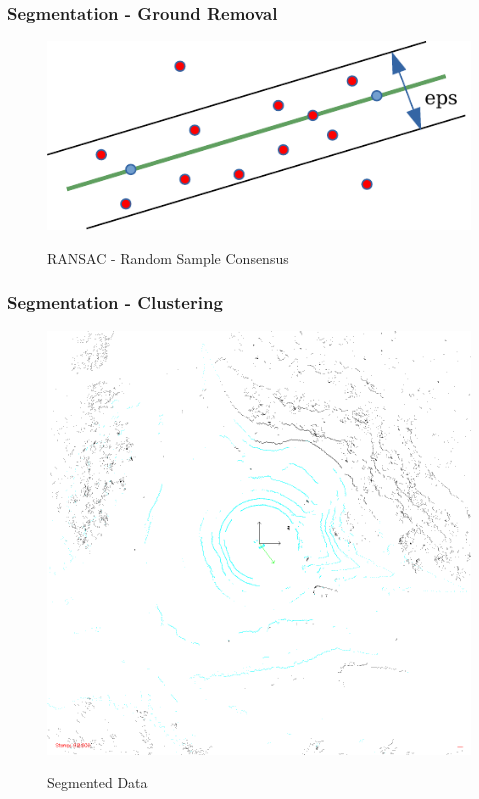 \documentclass[nosymbols]{beamer}	%
\begin{document}
\begin{frame}
\frametitle{Segmentation - Ground Removal}
\begin{figure}[!ht]
\begin{center}
\caption{RANSAC - Random Sample Consensus}
\includegraphics[width=\textwidth,height=0.7\textheight,keepaspectratio]{bilder/ransac.pdf}
\label{ransac}
\end{center}
\end{figure}
\end{frame}

\begin{frame}
\frametitle{Segmentation - Clustering}
\begin{figure}[!ht]
\caption{Segmented Data}
\includegraphics[width=\textwidth,height=0.7\textheight,keepaspectratio]{bilder/Segmentation/img100084.png}
\label{segments}
\end{figure}
\end{frame}
\end{document}
